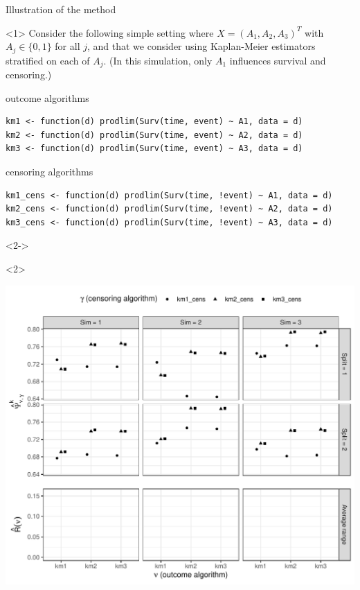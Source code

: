 \documentclass[smaller]{beamer}\usepackage{listings}
\begin{document}
\begin{frame}[label={sec:org1a3628f},fragile]{Illustration of the method}
 \begin{onlyenv}<1>
\small Consider the following simple setting where \(X=(A_1, A_2, A_3)^T\) with \(A_j \in \{0,1\}\)
for all \(j\), and that we consider using Kaplan-Meier estimators stratified on each of \(A_j\). (In
this simulation, only \(A_1\) influences survival and censoring.)

\vspace{.4cm}

\begin{block}{\centering outcome algorithms}
\lstset{language=r,label= ,caption= ,captionpos=b,numbers=none}
\begin{lstlisting}
km1 <- function(d) prodlim(Surv(time, event) ~ A1, data = d)
km2 <- function(d) prodlim(Surv(time, event) ~ A2, data = d)
km3 <- function(d) prodlim(Surv(time, event) ~ A3, data = d)
\end{lstlisting}
\end{block}

\begin{block}{\centering censoring algorithms}
\lstset{language=r,label= ,caption= ,captionpos=b,numbers=none}
\begin{lstlisting}
km1_cens <- function(d) prodlim(Surv(time, !event) ~ A1, data = d)
km2_cens <- function(d) prodlim(Surv(time, !event) ~ A2, data = d)
km3_cens <- function(d) prodlim(Surv(time, !event) ~ A3, data = d)
\end{lstlisting}
\end{block}
\end{onlyenv}

\begin{onlyenv}<2->
\begin{onlyenv}<2>
\begin{center}
\includegraphics[width=.9\linewidth]{fig-illustrate-fluct-risk.pdf}
\end{center}
\end{onlyenv}


\end{onlyenv}
\end{frame}
\end{document}
